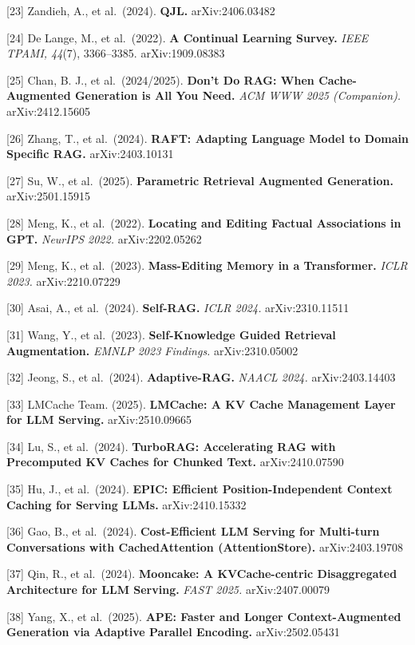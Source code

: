 \documentclass[10pt,twocolumn]{article}
\begin{document}
{[}23{]} Zandieh, A., et al.~(2024). \textbf{QJL.} arXiv:2406.03482

{[}24{]} De Lange, M., et al.~(2022). \textbf{A Continual Learning Survey.} \emph{IEEE TPAMI, 44}(7), 3366--3385. arXiv:1909.08383

{[}25{]} Chan, B. J., et al.~(2024/2025). \textbf{Don't Do RAG: When Cache-Augmented Generation is All You Need.} \emph{ACM WWW 2025 (Companion).} arXiv:2412.15605

{[}26{]} Zhang, T., et al.~(2024). \textbf{RAFT: Adapting Language Model to Domain Specific RAG.} arXiv:2403.10131

{[}27{]} Su, W., et al.~(2025). \textbf{Parametric Retrieval Augmented Generation.} arXiv:2501.15915

{[}28{]} Meng, K., et al.~(2022). \textbf{Locating and Editing Factual Associations in GPT.} \emph{NeurIPS 2022.} arXiv:2202.05262

{[}29{]} Meng, K., et al.~(2023). \textbf{Mass-Editing Memory in a Transformer.} \emph{ICLR 2023.} arXiv:2210.07229

{[}30{]} Asai, A., et al.~(2024). \textbf{Self-RAG.} \emph{ICLR 2024.} arXiv:2310.11511

{[}31{]} Wang, Y., et al.~(2023). \textbf{Self-Knowledge Guided Retrieval Augmentation.} \emph{EMNLP 2023 Findings.} arXiv:2310.05002

{[}32{]} Jeong, S., et al.~(2024). \textbf{Adaptive-RAG.} \emph{NAACL 2024.} arXiv:2403.14403

{[}33{]} LMCache Team. (2025). \textbf{LMCache: A KV Cache Management Layer for LLM Serving.} arXiv:2510.09665

{[}34{]} Lu, S., et al.~(2024). \textbf{TurboRAG: Accelerating RAG with Precomputed KV Caches for Chunked Text.} arXiv:2410.07590

{[}35{]} Hu, J., et al.~(2024). \textbf{EPIC: Efficient Position-Independent Context Caching for Serving LLMs.} arXiv:2410.15332

{[}36{]} Gao, B., et al.~(2024). \textbf{Cost-Efficient LLM Serving for Multi-turn Conversations with CachedAttention (AttentionStore).} arXiv:2403.19708

{[}37{]} Qin, R., et al.~(2024). \textbf{Mooncake: A KVCache-centric Disaggregated Architecture for LLM Serving.} \emph{FAST 2025.} arXiv:2407.00079

{[}38{]} Yang, X., et al.~(2025). \textbf{APE: Faster and Longer Context-Augmented Generation via Adaptive Parallel Encoding.} arXiv:2502.05431
\end{document}

